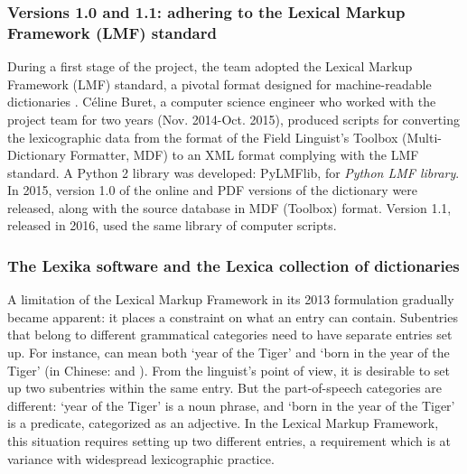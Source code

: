 

\subsubsection{Versions 1.0 and 1.1: adhering to the Lexical Markup Framework (LMF) standard}

During a first stage of the project, the team adopted the Lexical Markup Framework (LMF) standard, a pivotal format designed for machine-readable dictionaries \parencite{francopoulo2013,romary2013}. Céline Buret, a computer science engineer who worked with the project team for two years (Nov. 2014-Oct. 2015), produced scripts for converting the lexicographic data from the format of the Field Linguist’s Toolbox (Multi-Dictionary Formatter, MDF) to an XML format complying with the LMF standard. A Python 2 library was developed: PyLMFlib, for \emph{Python LMF library}. In 2015, version 1.0 of the online and PDF versions of the dictionary were released, along with the source database in MDF (Toolbox) format. Version 1.1, released in 2016, used the same library of computer scripts.

\subsubsection{The Lexika software and the Lexica collection of dictionaries}

A limitation of the Lexical Markup Framework in its 2013 formulation gradually became apparent: it places a constraint on what an entry can contain. Subentries that belong to different grammatical categories need to have separate entries set up. For instance,  can mean both ‘year of the Tiger’ and ‘born in the year of the Tiger’ (in Chinese:  and ). From the linguist’s point of view, it is desirable to set up two subentries within the same entry. But the part-of-speech categories are different: ‘year of the Tiger’ is a noun phrase, and ‘born in the year of the Tiger’ is a predicate, categorized as an adjective. In the Lexical Markup Framework, this situation requires setting up two different entries, a requirement which is at variance with widespread lexicographic practice.

